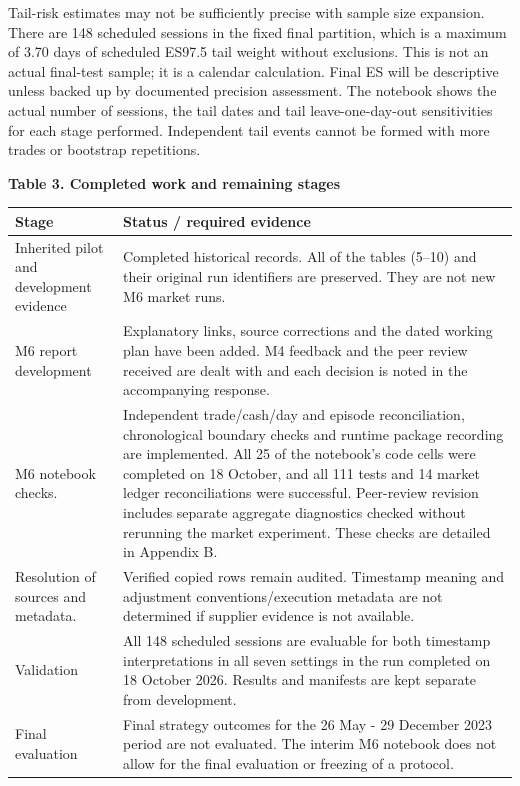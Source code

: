 \documentclass[11pt,a4paper]{article}
\newlength{\tablecontentwidth}
\begin{document}
Tail-risk estimates may not be sufficiently precise with sample size expansion. There are 148 scheduled sessions in the fixed final partition, which is a maximum of 3.70 days of scheduled ES97.5 tail weight without exclusions. This is not an actual final-test sample; it is a calendar calculation. Final ES will be descriptive unless backed up by documented precision assessment. The notebook shows the actual number of sessions, the tail dates and tail leave-one-day-out sensitivities for each stage performed. Independent tail events cannot be formed with more trades or bootstrap repetitions.

\par\addvspace{8pt}\noindent\begin{minipage}{\linewidth}
\textbf{Table 3. Completed work and remaining stages}\par\vspace{5pt}
\begingroup\fontsize{9.5}{11.7}\selectfont
\renewcommand{\arraystretch}{1.12}
\setlength{\tablecontentwidth}{\dimexpr\linewidth-2\tabcolsep\relax}
\noindent\begin{tabular}{@{}>{\RaggedRight\arraybackslash}p{0.32\tablecontentwidth}>{\RaggedRight\arraybackslash}p{0.68\tablecontentwidth}@{}}
\toprule
\textbf{Stage} & \textbf{Status / required evidence} \\[3pt]
\midrule
Inherited pilot and development evidence & Completed historical records. All of the tables (5--10) and their original run identifiers are preserved. They are not new M6 market runs. \\[3pt]
M6 report development & Explanatory links, source corrections and the dated working plan have been added. M4 feedback and the peer review received are dealt with and each decision is noted in the accompanying response. \\[3pt]
M6 notebook checks. & Independent trade/cash/day and episode reconciliation, chronological boundary checks and runtime package recording are implemented. All 25 of the notebook's code cells were completed on 18 October, and all 111 tests and 14 market ledger reconciliations were successful. Peer-review revision includes separate aggregate diagnostics checked without rerunning the market experiment. These checks are detailed in Appendix B. \\[3pt]
Resolution of sources and metadata. & Verified copied rows remain audited. Timestamp meaning and adjustment conventions/execution metadata are not determined if supplier evidence is not available. \\[3pt]
Validation & All 148 scheduled sessions are evaluable for both timestamp interpretations in all seven settings in the run completed on 18 October 2026. Results and manifests are kept separate from development. \\[3pt]
Final evaluation & Final strategy outcomes for the 26 May - 29 December 2023 period are not evaluated. The interim M6 notebook does not allow for the final evaluation or freezing of a protocol. \\[3pt]
\bottomrule\end{tabular}
\endgroup
\end{minipage}\par\addvspace{8pt}
\end{document}
